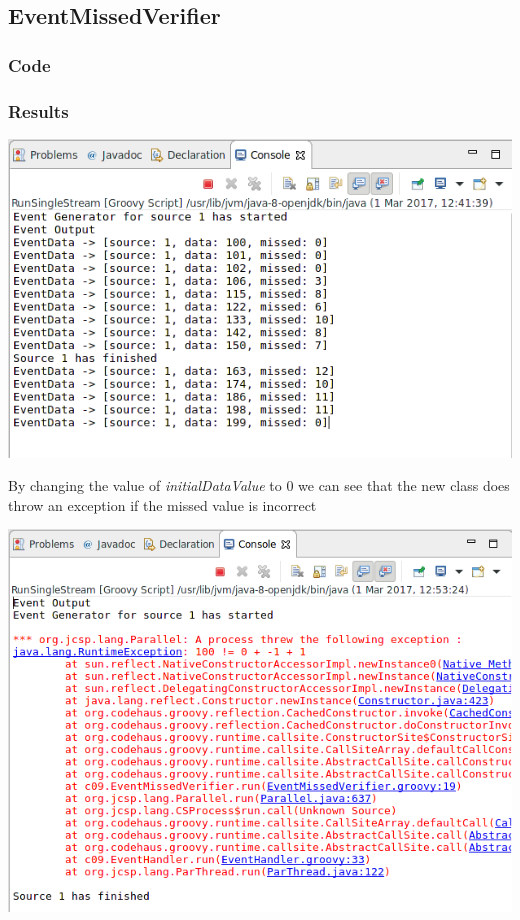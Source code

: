 \subsection{EventMissedVerifier}

\subsubsection*{Code}



\subsubsection*{Results}

\includegraphics[width=\textwidth]{img/screenshots/9-1-1.png}

By changing the value of \textit{initialDataValue} to 0 we can see that the new class does throw an exception if the missed value is incorrect

\includegraphics[width=\textwidth]{img/screenshots/9-1-2.png}
